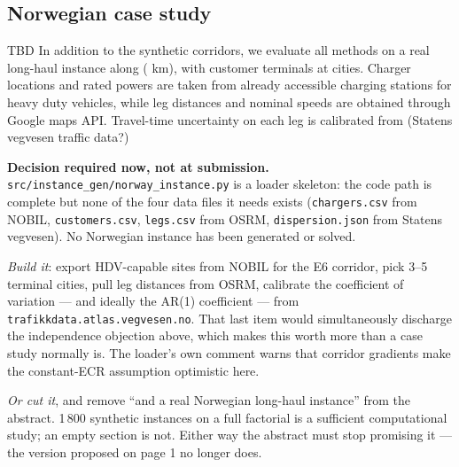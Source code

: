 \subsection{Norwegian case study}
{\color{red} TBD }
In addition to the synthetic corridors, we evaluate all methods on a real long-haul instance along  ( km), with  customer terminals at  cities. Charger locations and rated powers are taken from already accessible charging stations for heavy duty vehicles, while leg distances and nominal speeds are obtained through Google maps API. Travel-time uncertainty on each leg is calibrated from  (Statens vegvesen traffic data?)

\begin{atodo}
\textbf{Decision required now, not at submission.}
\texttt{src/instance\_gen/norway\_instance.py} is a loader skeleton: the code
path is complete but none of the four data files it needs exists
(\texttt{chargers.csv} from NOBIL, \texttt{customers.csv}, \texttt{legs.csv} from
OSRM, \texttt{dispersion.json} from Statens vegvesen). No Norwegian instance has
been generated or solved.

\medskip
\emph{Build it}: export HDV-capable sites from NOBIL for the E6 corridor, pick
3--5 terminal cities, pull leg distances from OSRM, calibrate the coefficient of
variation --- and ideally the AR(1) coefficient --- from
\texttt{trafikkdata.atlas.vegvesen.no}. That last item would simultaneously
discharge the independence objection above, which makes this worth more than a
case study normally is. The loader's own comment warns that corridor gradients
make the constant-ECR assumption optimistic here.

\medskip
\emph{Or cut it}, and remove ``and a real Norwegian long-haul instance'' from the
abstract. 1\,800 synthetic instances on a full factorial is a sufficient
computational study; an empty section is not. Either way the abstract must stop
promising it --- the version proposed on page 1 no longer does.
\end{atodo}
